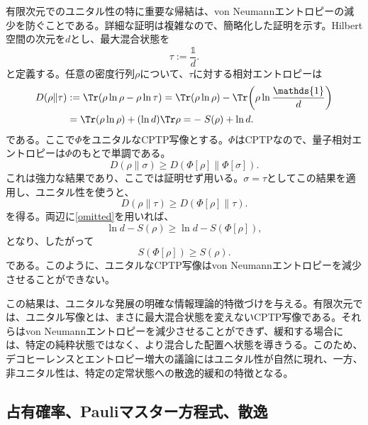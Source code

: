 \documentclass[a4paper,11pt,oneside]{article}
\theoremstyle{definition}
\numberwithin{equation}{section}
\begin{document}
有限次元でのユニタル性の特に重要な帰結は、von Neumannエントロピーの減少を防ぐことである。詳細な証明は複雑なので、簡略化した証明を示す。Hilbert空間の次元を$d$とし、最大混合状態を
\begin{equation}
\tau := \frac{\mathds{1} }{d} .
\end{equation}
と定義する。任意の密度行列$\rho$について、$\tau$に対する相対エントロピーは
\begin{align}\label{omitted}
D(\rho\|\tau)
&:=
\Tr\!\left(\rho\ln\rho - \rho\ln\tau\right)
=
\Tr(\rho\ln\rho) - \Tr\!\left(\rho\ln\frac{\mathds{1} }{d}\right)
\nonumber\\
&=
\Tr(\rho\ln\rho) + (\ln d)\Tr\rho
=
-\;S(\rho)+\ln d .
\end{align}
である。ここで$\Phi$をユニタルなCPTP写像とする。$\Phi$はCPTPなので、量子相対エントロピーは$\Phi$のもとで単調である。
\begin{equation}
D(\rho\|\sigma)\geq D(\Phi[\rho]\|\Phi[\sigma]) .
\end{equation}
これは強力な結果であり、ここでは証明せず用いる。$\sigma=\tau$としてこの結果を適用し、ユニタル性を使うと、
\begin{equation}
D(\rho\|\tau)\geq D(\Phi[\rho]\|\tau) .
\end{equation}
を得る。両辺に\eqref{omitted}を用いれば、
\begin{equation}
\ln d - S(\rho) \geq \ln d - S(\Phi[\rho]) ,
\end{equation}
となり、したがって
\begin{equation}
S(\Phi[\rho]) \geq S(\rho) .
\end{equation}
である。このように、ユニタルなCPTP写像はvon Neumannエントロピーを減少させることができない。



この結果は、ユニタルな発展の明確な情報理論的特徴づけを与える。有限次元では、ユニタル写像とは、まさに最大混合状態を変えないCPTP写像である。それらはvon Neumannエントロピーを減少させることができず、緩和する場合には、特定の純粋状態ではなく、より混合した配置へ状態を導きうる。このため、デコヒーレンスとエントロピー増大の議論にはユニタル性が自然に現れ、一方、非ユニタル性は、特定の定常状態への散逸的緩和の特徴となる。








\subsection{占有確率、Pauliマスター方程式、散逸}
\end{document}
